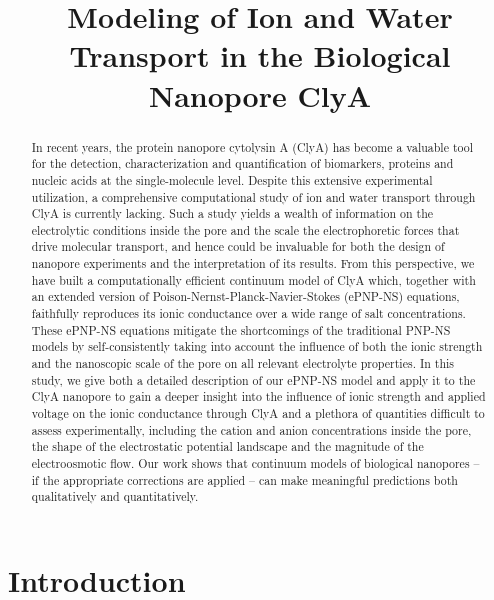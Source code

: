 \documentclass[journal=ancac3,manuscript=article,etalmode=truncate,maxauthors=0,layout=onecolumn]{achemso}
\title{Modeling of Ion and Water Transport in the Biological Nanopore ClyA}
\begin{document}
\begin{tocentry}
\end{tocentry}



\begin{abstract}
  \footnotesize
  In recent years, the protein nanopore cytolysin A (ClyA) has become a valuable
  tool for the detection, characterization and quantification of biomarkers,
  proteins and nucleic acids at the single-molecule level. Despite this
  extensive experimental utilization, a comprehensive computational study of ion
  and water transport through ClyA is currently lacking. Such a study yields a
  wealth of information on the electrolytic conditions inside the pore and the
  scale the electrophoretic forces that drive molecular transport, and hence
  could be invaluable for both the design of nanopore experiments and the
  interpretation of its results. From this perspective, we have built a
  computationally efficient continuum model of ClyA which, together with an
  extended version of Poison-Nernst-Planck-Navier-Stokes (ePNP-NS) equations,
  faithfully reproduces its ionic conductance over a wide range of salt
  concentrations. These ePNP-NS equations mitigate the shortcomings of the
  traditional PNP-NS models by self-consistently taking into account the
  influence of both the ionic strength and the nanoscopic scale of the pore on
  all relevant electrolyte properties. In this study,  we give both a detailed
  description of our ePNP-NS model and apply it to the ClyA nanopore to gain a
  deeper insight into the influence of ionic strength and applied voltage on the
  ionic conductance through ClyA and a plethora of quantities difficult to
  assess experimentally, including the cation and anion concentrations inside
  the pore, the shape of the electrostatic potential landscape and the magnitude
  of the electroosmotic flow. Our work shows that continuum models of
  biological nanopores -- if the appropriate corrections are applied -- can make
  meaningful predictions both qualitatively and quantitatively.
\end{abstract}


\section{Introduction}
\end{document}
